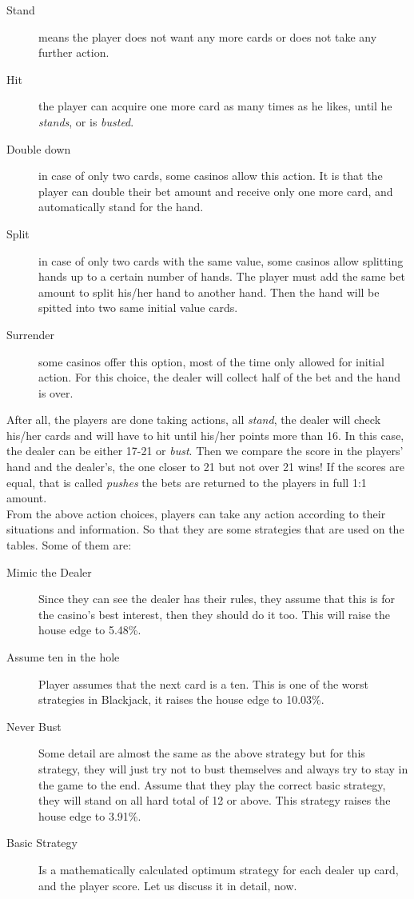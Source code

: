 \documentclass{article}
\begin{document}
\begin{description}

\item[Stand] means the player does not want any more cards or does not take any further action.
\item[Hit] the player can acquire one more card as many times as he likes, until he \emph{stands}, or is \emph{busted}.
\item[Double down] in case of only two cards, some casinos allow this action.  It is that the player can double their bet amount and receive only one more card, and automatically stand for the hand.
\item[Split] in case of only two cards with the same value, some casinos allow splitting hands up to a certain number of hands.  The player must add the same bet amount to split his/her hand to another hand.  Then the hand will be spitted into two same initial value cards.  
\item[Surrender] some casinos offer this option, most of the time only allowed for initial action.  For this choice, the dealer will collect half of the bet and the hand is over. 
\end{description}

After all, the players are done taking actions, all \emph{stand}, the dealer will check his/her cards and will have to hit until his/her points more than 16.  In this case, the dealer can be either 17-21 or \emph{bust}.  Then we compare the score in the players' hand and the dealer's, the one closer to 21 but not over 21 wins!  If the scores are equal, that is called \emph{pushes} the bets are returned to the players in full 1:1 amount.\\

From the above action choices, players can take any action according to their situations and information.  So that they are some strategies that are used on the tables.  Some of them are:
\begin{description}
\item[Mimic the Dealer] Since they can see the dealer has their rules, they assume that this is for the casino's best interest, then they should do it too. This will raise the house edge to 5.48\%.
\item[Assume ten in the hole] Player assumes that the next card is a ten. This is one of the worst strategies in Blackjack, it raises the house edge to 10.03\%.
\item[Never Bust] Some detail are almost the same as the above strategy but for this strategy, they will just try not to bust themselves and always try to stay in the game to the end.  Assume that they play the correct basic strategy, they will stand on all hard total of 12 or above. This strategy raises the house edge to 3.91\%.
\item[Basic Strategy] Is a mathematically calculated optimum strategy for each dealer up card, and the player score.  Let us discuss it in detail, now.
\end{description}
\end{document}
